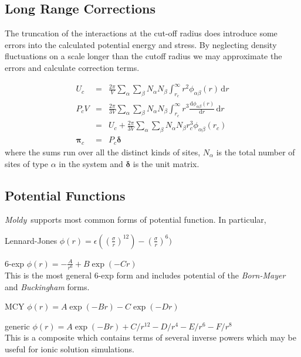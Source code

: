 \documentclass[a4paper,twoside]{report}
\newcommand{\bm}[1]{\mathbf{#1}}
\newcommand{\Calcd}{\mathrm{d}}
\newcommand{\moldy}{\emph{Moldy}}
\begin{document}
\subsection{Long Range Corrections}
The truncation of the interactions at the cut-off radius does
introduce some errors into the calculated potential energy and stress.
By neglecting density fluctuations on a scale longer than the cutoff
radius we may approximate the errors and calculate correction 
terms\cite[pp 64-65]{allen:87}.

\begin{eqnarray}
U_c & = & \frac{2\pi}{V} \sum_\alpha \sum_\beta N_\alpha N_\beta 
               \int_{r_c}^\infty r^2 \phi_{\alpha\beta}(r) \, \Calcd r \\
P_c V & = & \frac{2\pi}{3 V} \sum_\alpha \sum_\beta N_\alpha N_\beta 
               \int_{r_c}^\infty r^3 
               \frac{\Calcd\phi_{\alpha\beta}(r)}{\Calcd r}
                \, \Calcd r \nonumber \\ 
           & = & U_c + \frac{2\pi}{3 V} \sum_\alpha \sum_\beta
           N_\alpha N_\beta r_c^3 \phi_{\alpha\beta}(r_c) \\
\bm\pi_c & = & P_c \bm\delta
\end{eqnarray}
where the sums run over all the distinct kinds of sites,
$N_\alpha$ is the total number of sites of type $\alpha$ in the system
and $\bm\delta$ is the unit matrix.


\subsection{Potential Functions}
\label{sec:potentials}
\moldy\ supports most common forms of potential function.  In
particular, 
\begin{list}{}{  \leftmargin=1.5in \parsep=0in
\renewcommand{\makelabel}[1]{\emph{#1} \hfil}}
\item[Lennard-Jones] $\phi(r) = \epsilon((\frac{\sigma}{r})^{12}) -
(\frac{\sigma}{r})^{6})$
\item[6-exp] $\phi(r) = -\frac{A}{r^{6}} +
B\exp(-Cr)$\\
This is the most general 6-exp form and
includes potential of the \emph{Born-Mayer} and \emph{Buckingham} forms.
\item[MCY] $\phi(r) = A \exp(-Br) - C \exp(-Dr)$
\item[generic]  $\phi(r) = A \exp(-Br) + C/r^{12} - D/r^4 -E/r^6 -F/r^8$\\
This is a composite which contains terms of several inverse powers
which may be useful for ionic solution simulations.
\end{list}
\end{document}
